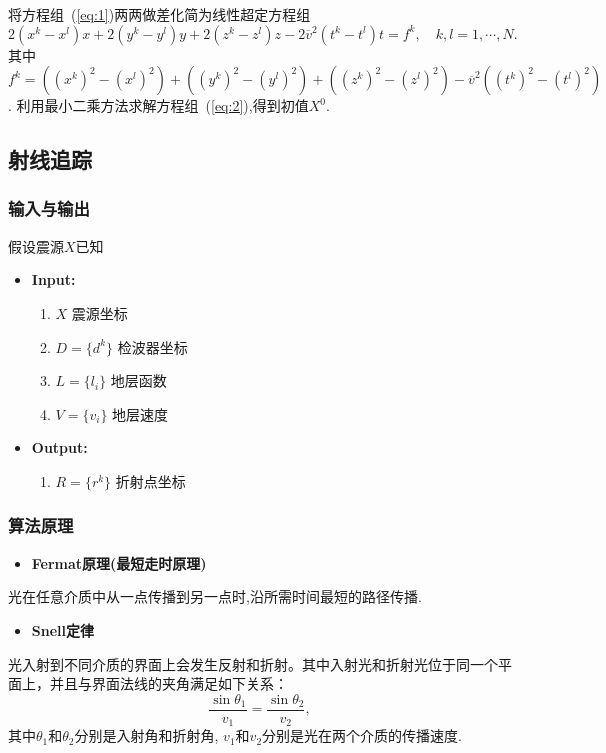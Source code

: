 \documentclass{article}
\begin{document}
\begin{CJK*}{UTF8}{gkai}
  将方程组~(\ref{eq:1})两两做差化简为线性超定方程组
  \begin{equation}\label{eq:2}
    2(x^k-x^l)x+2(y^k-y^l)y+2(z^k-z^l)z-2 \overline{v}^2(t^k-t^l)t = f^k, \quad k,l = 1, \cdots, N.
  \end{equation}
  其中$f^k = ((x^k)^2-(x^l)^2) + ((y^k)^2-(y^l)^2) + ((z^k)^2-(z^l)^2) - \overline{v}^2((t^k)^2-(t^l)^2)$.
  利用最小二乘方法求解方程组~(\ref{eq:2}),得到初值$X^0$.

  \subsection{射线追踪}

  \subsubsection{输入与输出}


  假设震源$X$已知
  \begin{itemize}
  \item \textbf{Input:}
    \begin{enumerate}
    \item $X $ 震源坐标
    \item $D=\{d^k\}$ 检波器坐标
    \item $L=\{l_i\}$ 地层函数
    \item $V=\{v_i\}$ 地层速度
    \end{enumerate}
  \item \textbf{Output:}
    \begin{enumerate}
    \item $R=\{ r^k \}$ 折射点坐标
    \end{enumerate}
  \end{itemize}

  \subsubsection{算法原理}
  \begin{itemize}
  \item \textbf{Fermat原理(最短走时原理)}
  \end{itemize}
  \qquad 光在任意介质中从一点传播到另一点时,沿所需时间最短的路径传播.

  \begin{itemize}
  \item \textbf{Snell定律}
  \end{itemize}
  \qquad 光入射到不同介质的界面上会发生反射和折射。其中入射光和折射光位于同一个平面上，并且与界面法线的夹角满足如下关系：
  \begin{equation*}
    \frac{\sin \theta_1}{ v_1} = \frac{\sin \theta_2}{ v_2},
  \end{equation*}其中$\theta_1$和$\theta_2$分别是入射角和折射角, $v_1$和$v_2$分别是光在两个介质的传播速度.


\end{CJK*}
\end{document}
